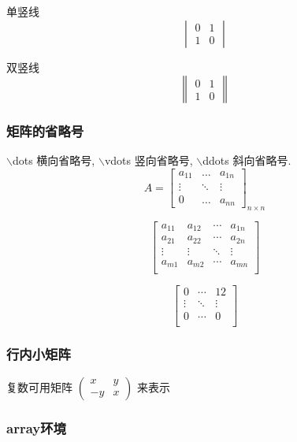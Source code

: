 \documentclass[UTF8]{ctexart}
\begin{document}
 单竖线
\[
\begin{vmatrix}
0 & 1 \\
1 & 0 
\end{vmatrix}
\]

双竖线
\[
\begin{Vmatrix}
0 & 1 \\
1 & 0 
\end{Vmatrix}
\]

\subsubsection{矩阵的省略号}
$\backslash$dots 横向省略号,
$\backslash$vdots 竖向省略号,
$\backslash$ddots 斜向省略号.
\[
A = \begin{bmatrix}
a_{11} & \dots & a_{1n}\\
\vdots & \ddots & \vdots \\
0 & \dots & a_{nn}
\end{bmatrix}_{n \times n}
\]


$$\begin{bmatrix}
{a_{11}}&{a_{12}}&{\cdots}&{a_{1n}}\\
{a_{21}}&{a_{22}}&{\cdots}&{a_{2n}}\\
{\vdots}&{\vdots}&{\ddots}&{\vdots}\\
{a_{m1}}&{a_{m2}}&{\cdots}&{a_{mn}}\\
\end{bmatrix}
$$


$$\begin{bmatrix}
0  &  \cdots &  12\\
\vdots &  \ddots &  \vdots\\
0 &  \cdots  &  0\\

\end{bmatrix}
$$

\subsubsection{行内小矩阵}
复数可用矩阵
\begin{math}
\left(
\begin{smallmatrix}
x & y \\ -y & x
\end{smallmatrix}
\right)
\end{math}
来表示

\subsubsection{array环境}
\end{document}
